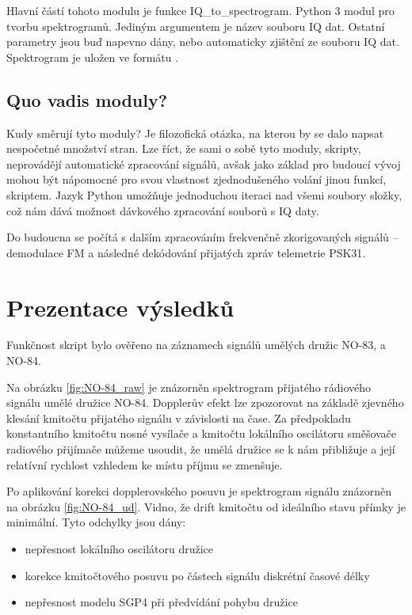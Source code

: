 Hlavní částí tohoto modulu je funkce IQ\_to\_spectrogram.
Python 3 modul pro tvorbu spektrogramů. Jediným argumentem je název souboru IQ dat. Ostatní parametry jsou buď napevno dány, nebo automaticky zjištění ze souboru IQ dat. Spektrogram je uložen ve formátu .

\section{Quo vadis moduly?}

Kudy směrují tyto moduly? Je filozofická otázka, na kterou by se dalo napsat nespočetné množství stran. Lze říct, že sami o sobě tyto moduly, skripty, neprovádějí automatické zpracování signálů, avšak jako základ pro budoucí vývoj mohou být nápomocné pro svou vlastnost zjednodušeného volání jinou funkcí, skriptem. Jazyk Python umožňuje jednoduchou iteraci nad všemi soubory složky, což nám dává možnost dávkového zpracování souborů s IQ daty.

Do budoucna se počítá s dalším zpracováním frekvenčně zkorigovaných signálů -- demodulace FM a následné dekódování přijatých zpráv telemetrie PSK31.


\chapter{Prezentace výsledků}
\label{chap:prez}

Funkčnost skript bylo ověřeno na záznamech signálů umělých družic NO-83, a NO-84.

Na obrázku \ref{fig:NO-84_raw} je znázorněn spektrogram přijatého rádiového signálu umělé družice NO-84. Dopplerův efekt lze zpozorovat na základě zjevného klesání kmitočtu přijatého signálu v závislosti na čase. Za předpokladu konstantního kmitočtu nosné vysílače a kmitočtu lokálního oscilátoru směšovače radiového přijímače můžeme usoudit, že umělá družice se k nám přibližuje a její relatívní rychlost vzhledem ke místu příjmu se zmenšuje.

Po aplikování korekci dopplerovského posuvu je spektrogram signálu znázorněn na obrázku \ref{fig:NO-84_ud}. Vidno, že drift kmitočtu od ideálního stavu přímky je minimální. Tyto odchylky jsou dány:

\begin{itemize}
  \item nepřesnost lokálního oscilátoru družice
  \item korekce kmitočtového posuvu po částech signálu diskrétní časové délky
  \item nepřesnost modelu SGP4 při předvídání pohybu družice
\end{itemize}


